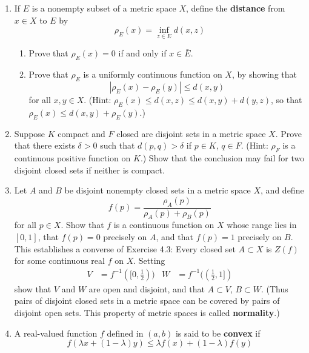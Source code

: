 \documentclass[../psets.tex]{subfiles}
\begin{document}
\begin{enumerate}[label={\textbf{\arabic*.}}]
    \item If $E$ is a nonempty subset of a metric space $X$, define the \textbf{distance} from $x\in X$ to $E$ by
    \begin{equation*}
        \rho_E(x) = \inf_{z\in E}d(x,z)
    \end{equation*}
    \begin{enumerate}
        \item Prove that $\rho_E(x)=0$ if and only if $x\in\bar{E}$.
        \item Prove that $\rho_E$ is a uniformly continuous function on $X$, by showing that
        \begin{equation*}
            |\rho_E(x)-\rho_E(y)| \leq d(x,y)
        \end{equation*}
        for all $x,y\in X$. (Hint: $\rho_E(x)\leq d(x,z)\leq d(x,y)+d(y,z)$, so that $\rho_E(x)\leq d(x,y)+\rho_E(y)$.)
    \end{enumerate}
    \item Suppose $K$ compact and $F$ closed are disjoint sets in a metric space $X$. Prove that there exists $\delta>0$ such that $d(p,q)>\delta$ if $p\in K$, $q\in F$. (Hint: $\rho_F$ is a continuous positive function on $K$.) Show that the conclusion may fail for two disjoint closed sets if neither is compact.
    \item Let $A$ and $B$ be disjoint nonempty closed sets in a metric space $X$, and define
    \begin{equation*}
        f(p) = \frac{\rho_A(p)}{\rho_A(p)+\rho_B(p)}
    \end{equation*}
    for all $p\in X$. Show that $f$ is a continuous function on $X$ whose range lies in $[0,1]$, that $f(p)=0$ precisely on $A$, and that $f(p)=1$ precisely on $B$. This establishes a converse of Exercise 4.3: Every closed set $A\subset X$ is $Z(f)$ for some continuous real $f$ on $X$. Setting
    \begin{align*}
        V &= f^{-1}([0,\tfrac{1}{2}))&
        W &= f^{-1}((\tfrac{1}{2},1])
    \end{align*}
    show that $V$ and $W$ are open and disjoint, and that $A\subset V$, $B\subset W$. (Thus pairs of disjoint closed sets in a metric space can be covered by pairs of disjoint open sets. This property of metric spaces is called \textbf{normality}.)
    \item A real-valued function $f$ defined in $(a,b)$ is said to be \textbf{convex} if
    \begin{equation*}
        f(\lambda x+(1-\lambda)y) \leq \lambda f(x)+(1-\lambda)f(y)

\end{equation*}
\end{enumerate}
\end{document}
